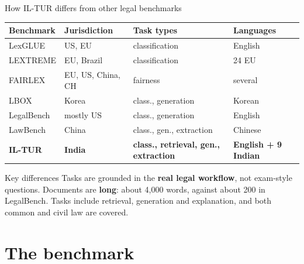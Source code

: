 \documentclass[aspectratio=169,11pt]{beamer}
\begin{document}
\begin{frame}{How IL-TUR differs from other legal benchmarks}
  \centering
  \footnotesize
  \begin{tabular}{@{}llll@{}}
    \toprule
    Benchmark & Jurisdiction & Task types & Languages\\
    \midrule
    LexGLUE & US, EU & classification & English\\
    LEXTREME & EU, Brazil & classification & 24 EU\\
    FAIRLEX & EU, US, China, CH & fairness & several\\
    LBOX & Korea & class., generation & Korean\\
    LegalBench & mostly US & class., generation & English\\
    LawBench & China & class., gen., extraction & Chinese\\
    \textbf{IL-TUR} & \textbf{India} & \textbf{class., retrieval, gen., extraction} & \textbf{English + 9 Indian}\\
    \bottomrule
  \end{tabular}
  \vspace{2mm}

  \raggedright
  \begin{exampleblock}{Key differences}
    \small
    Tasks are grounded in the \textbf{real legal workflow}, not exam-style questions. Documents are \textbf{long}: about 4,000 words, against about 200 in LegalBench. Tasks include retrieval, generation and explanation, and both common and civil law are covered.
  \end{exampleblock}
\end{frame}

\section{The benchmark}
\end{document}
